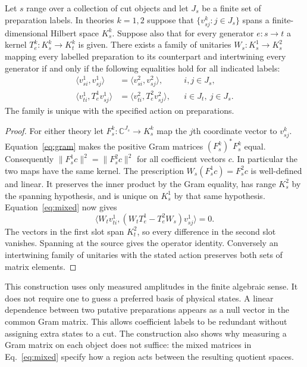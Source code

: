 \documentclass[11pt,letterpaper]{article}
\newcommand{\CC}{\mathbb C}
\begin{document}
\begin{theorem}
\label{thm:gram}
Let \(s\) range over a collection of cut objects and let \(J_s\) be a
finite set of preparation labels. In theories \(k=1,2\) suppose that
\(\{v^k_{sj}:j\in J_s\}\) spans a finite-dimensional Hilbert space
\(K_s^k\). Suppose also that for every generator \(e:s\to t\) a kernel
\(T_e^k:K_s^k\to K_t^k\) is given. There exists a family of unitaries
\(W_s:K_s^1\to K_s^2\) mapping every labelled preparation to its
counterpart and intertwining every generator if and only if the following
equalities hold for all indicated labels:
\begin{align}
 \langle v^1_{si},v^1_{sj}\rangle
    &=\langle v^2_{si},v^2_{sj}\rangle ,
 &&i,j\in J_s,                                           \label{eq:gram}\\
 \langle v^1_{ti},T^1_e v^1_{sj}\rangle
    &=\langle v^2_{ti},T^2_e v^2_{sj}\rangle ,
 &&i\in J_t,\ j\in J_s.                                 \label{eq:mixed}
\end{align}
The family is unique with the specified action on preparations.
\end{theorem}
\begin{proof}
For either theory let \(F_s^k:\CC^{J_s}\to K_s^k\) map the \(j\)th
coordinate vector to \(v^k_{sj}\).
Equation~\eqref{eq:gram} makes the positive Gram matrices
\((F_s^k)^*F_s^k\) equal. Consequently
\(\|F_s^1 c\|^2=\|F_s^2 c\|^2\) for all coefficient vectors \(c\).
In particular the two maps have the same kernel. The prescription
\(W_s(F_s^1 c)=F_s^2 c\) is well-defined and linear. It preserves the
inner product by the Gram equality, has range \(K_s^2\) by the spanning
hypothesis, and is unique on \(K_s^1\) by that same hypothesis.
Equation~\eqref{eq:mixed} now gives
\[
 \langle W_t v^1_{ti},
        (W_t T_e^1-T_e^2 W_s)v^1_{sj}\rangle=0 .
\]
The vectors in the first slot span \(K_t^2\), so every difference in the
second slot vanishes. Spanning at the source gives the operator identity.
Conversely an intertwining family of unitaries with the stated action
preserves both sets of matrix elements.
\end{proof}

This construction uses only measured amplitudes in the finite algebraic
sense. It does not require one to guess a preferred basis of physical
states. A linear dependence between two putative preparations appears as
a null vector in the common Gram matrix. This allows coefficient labels
to be redundant without assigning extra states to a cut. The construction
also shows why measuring a Gram matrix on each object does not suffice:
the mixed matrices in Eq.~\eqref{eq:mixed} specify how a region acts
between the resulting quotient spaces.
\end{document}
